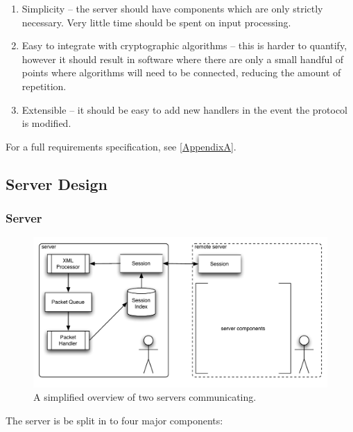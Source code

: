     \begin{enumerate}
      \item Simplicity -- the server should have components which are only strictly necessary. Very little time should be spent on input processing.
      \item Easy to integrate with cryptographic algorithms -- this is harder to quantify, however it should result in software where there are only a small handful of points where algorithms will need to be connected, reducing the amount of repetition.
      \item Extensible -- it should be easy to add new handlers in the event the protocol is modified.
    \end{enumerate}
    
    For a full requirements specification, see \textsection \ref{AppendixA}.
    
  \subsection{Server Design}
  
    \subsubsection{Server}
    
      \begin{figure}
        \centering
        \includegraphics[scale=0.7]{./Figures/Ch6/6-4-2.pdf}
        \caption{A simplified overview of two servers communicating.}
        \label{fig:server_overview}
      \end{figure}
      
    The server is be split in to four major components:
    
